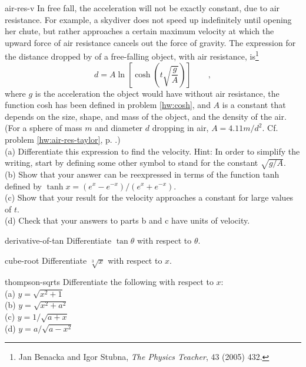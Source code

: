 \begin{hwsection}
\begin{hwwithsoln}{air-res-v}
In free fall, the acceleration will not be exactly constant, due to air resistance. For example,
a skydiver does not speed up indefinitely until opening her chute, but rather approaches a certain
maximum velocity at which the upward force of air resistance cancels out the force of gravity.
The expression for the distance dropped by of a free-falling object, with air resistance, is\footnote{Jan Benacka
and Igor Stubna, \emph{The Physics Teacher}, 43 (2005) 432.}
\begin{equation*}
  d = A \ln\left[\cosh\left(t\sqrt{\frac{g}{A}}\right)\right] \qquad ,
\end{equation*}
where $g$ is the acceleration the object would have without air resistance, the function cosh
has been defined in problem \ref{hw:cosh}, and
$A$ is a constant that depends on the size, shape, and mass of the object, and the density of
the air. (For a sphere of mass $m$ and diameter $d$ dropping in air, $A=4.11m/d^2$.
Cf. problem \ref{hw:air-res-taylor}, p. \pageref{hw:air-res-taylor}.)\\
(a) Differentiate this expression to find the velocity.  Hint: In order to simplify the writing,
start by defining some other symbol to stand for the constant $\sqrt{g/A}$.\\
(b) Show that your answer can be reexpressed in terms of the function tanh defined by
$\tanh x=(e^x-e^{-x})/(e^x+e^{-x})$.\\
(c) Show that your result for the velocity approaches
a constant for large values of $t$.\\
(d) Check that your answers to parts b and c have units of velocity.
\end{hwwithsoln}

\begin{hwwithsoln}{derivative-of-tan}
Differentiate $\tan\theta$ with respect to $\theta$.
\end{hwwithsoln}

\begin{hwwithsoln}{cube-root}
Differentiate $\sqrt[3]{x}$ with respect to $x$.
\end{hwwithsoln}

\begin{hwwithsoln}{thompson-sqrts}
Differentiate the following with respect to $x$:\\
(a) $y=\sqrt{x^2+1}$ \\
(b) $y=\sqrt{x^2+a^2}$ \\
(c) $y=1/\sqrt{a+x}$ \\
(d) $y=a/\sqrt{a-x^2}$ \\
 \thompson
\end{hwwithsoln}


\end{hwsection}

